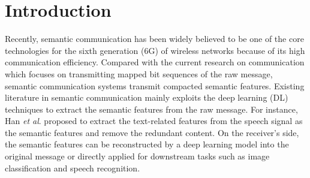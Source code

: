 \documentclass[conference]{IEEEtran}
\begin{document}
\section{Introduction}
Recently, semantic communication has been widely believed to be one of the core technologies for the sixth generation (6G) of wireless networks because of its high communication efficiency\cite{qin2021semantic}. Compared with the current research on communication which focuses on transmitting mapped bit sequences of the raw message\cite{he2021efficient, ji2021dynamic, xing2022energy}, semantic communication systems transmit compacted semantic features. Existing literature in semantic communication mainly exploits the deep learning (DL) techniques to extract the semantic features from the raw message. For instance, Han \emph{et al}. \cite{han2022semantic} proposed to extract the text-related features from the speech signal as the semantic features and remove the redundant content. On the receiver's side, the semantic features can be reconstructed by a deep learning model into the original message or directly applied for downstream tasks such as image classification and speech recognition.


\end{document}
